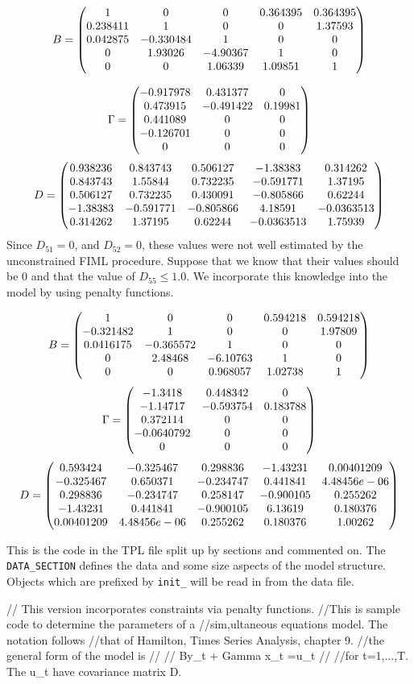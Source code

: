 $$B=\left(\begin{matrix}
1&0&0&0.364395&0.364395\cr
0.238411&1&0&0&1.37593\cr
0.042875&-0.330484&1&0&0\cr
0&1.93026&-4.90367&1&0\cr
0&0&1.06339&1.09851&1
 \end{matrix}\right)
$$

$$\Gamma=\left(\begin{matrix}
-0.917978&0.431377&0\cr
0.473915&-0.491422&0.19981\cr
0.441089&0&0\cr
-0.126701&0&0\cr
0&0&0
\end{matrix}
\right)
$$
$$D=\left(\begin{matrix}
0.938236&0.843743&0.506127&-1.38383&0.314262\cr
0.843743&1.55844&0.732235&-0.591771&1.37195\cr
0.506127&0.732235&0.430091&-0.805866&0.62244\cr
-1.38383&-0.591771&-0.805866&4.18591&-0.0363513\cr
0.314262&1.37195&0.62244&-0.0363513&1.75939
\end{matrix}
\right)
$$
Since $D_{51}=0$, and $D_{52}=0$, these values were not well 
estimated by the unconstrained FIML procedure. Suppose that
we know that their values should be $0$ and that the
value of $D_{55}\le1.0$. We incorporate this knowledge
into the model by using penalty functions. 

$$B=\left(\begin{matrix}
1&0&0&0.594218&0.594218\cr
-0.321482&1&0&0&1.97809\cr
0.0416175&-0.365572&1&0&0\cr
0&2.48468&-6.10763&1&0\cr
0&0&0.968057&1.02738&1
\end{matrix}
\right)
$$
$$\Gamma=\left(\begin{matrix}
-1.3418&0.448342&0\cr
-1.14717&-0.593754&0.183788\cr
0.372114&0&0\cr
-0.0640792&0&0\cr
0&0&0
\end{matrix}\right)
$$
$$D=\left(\begin{matrix}
0.593424&-0.325467&0.298836&-1.43231&0.00401209\cr
-0.325467&0.650371&-0.234747&0.441841&4.48456e-06\cr
0.298836&-0.234747&0.258147&-0.900105&0.255262\cr
-1.43231&0.441841&-0.900105&6.13619&0.180376\cr
0.00401209&4.48456e-06&0.255262&0.180376&1.00262
\end{matrix}
\right)
$$

This is the code in the TPL file split up by sections and
commented on. The {\tt DATA\_SECTION} defines the data and some size
aspects of the model structure. Objects which are prefixed by {\tt init\_}
will be read in from the data file.
\beginexample
   
  // This version incorporates constraints via penalty functions.
  //This is sample code to determine the parameters of a
  //sim,ultaneous equations model. The notation follows
  //that of Hamilton, Times Series Analysis, chapter 9.
  //the general form of the model is
  //
  //    By_t + Gamma x_t =u_t
  //
  //for t=1,...,T. The u_t have covariance matrix D.

